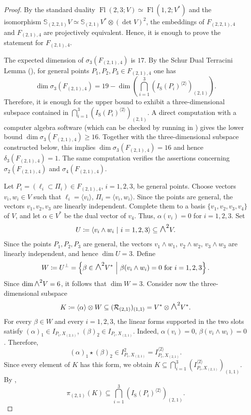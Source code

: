 \documentclass[a4paper,reqno]{amsart}
\theoremstyle{plainnopunct}
\theoremstyle{definitionnopunct}
\newcommand{\superwedge}{\mathlarger{\mathlarger{\wedge}}}
\renewcommand{\S}{\mathbb{S}}
\newcommand{\cR}{\mathcal{R}}
\DeclareMathOperator{\Fl}{Fl}
\begin{document}
\begin{proof}
By the standard duality
$\Fl(2,3;V)
\simeq
\Fl(1,2;V^*)$
and the isomorphism
$\S_{(2,2,1)}V
\simeq
\S_{(2,1)}V^*
\otimes
(\det V)^2$,
the embeddings of $F_{(2,2,1),4}$ and $F_{(2,1),4}$ are
projectively equivalent. Hence, it is enough to prove the statement
for $F_{(2,1),4}$.

The expected dimension of $\sigma_3(F_{(2,1),4})$ is $17$.
By the Schur Dual Terracini Lemma
(), for general points
$P_1,P_2,P_3\in F_{(2,1),4}$ one has
\[
\dim\sigma_3(F_{(2,1),4})
=
19-
\dim
\left(
\bigcap_{i=1}^{3}
\left(
I_{\mathrm S}(P_i)^{\langle2\rangle}
\right)_{(2,1)}
\right).
\]
Therefore, it is enough for the upper bound to exhibit a
three-dimensional subspace contained in $\bigcap_{i=1}^{3}
\left(
I_{\mathrm S}(P_i)^{\langle2\rangle}
\right)_{(2,1)}$.
A direct computation with a computer algebra software
(which can be checked by running  in \cite{Repo})
gives the lower bound $\dim\sigma_3(F_{(2,1),4})\geq16$.
Together with the three-dimensional subspace constructed below, this
implies $\dim\sigma_3(F_{(2,1),4})=16$
and hence $\delta_3(F_{(2,1),4})=1$.
The same computation verifies the assertions concerning
$\sigma_2(F_{(2,1),4})$ and $\sigma_4(F_{(2,1),4})$.

Let $P_i=(\ell_i\subset\Pi_i)
\in
F_{(2,1),4}$, $i=1,2,3$,
be general points. Choose vectors $v_i,w_i\in V$ such that $\ell_i=\langle v_i\rangle$,
$\Pi_i=\langle v_i,w_i\rangle$.
Since the points are general, the vectors $v_1,v_2,v_3$
are linearly independent. Complete them to a basis $\{v_1,v_2,v_3,v_4\}$
 of $V$, and let $\alpha\in V^*$
be the dual vector of $v_4$. Thus, $\alpha(v_i)=0$ for $i=1,2,3$. Set
\[
U
\coloneq
\left\langle
v_i\wedge w_i
\ \middle|\
i=1,2,3
\right\rangle
\subseteq
\superwedge^2V.
\]
Since the points $P_1,P_2,P_3$ are general, the vectors
$v_1\wedge w_1$, $v_2\wedge w_2$,
$v_3\wedge w_3$
are linearly independent, and hence
$\dim U=3$.
Define
\[
W
\coloneq
U^\perp
=
\left\{
\beta\in\superwedge^2V^*
\ \middle|\
\beta(v_i\wedge w_i)=0
\text{ for }i=1,2,3
\right\}.
\]
Since $\dim\superwedge^2V=6$,
it follows that
$\dim W=3$. Consider now the three-dimensional subspace
\[
K
\coloneq
\langle\alpha\rangle\otimes W
\subseteq
(\cR_{(2,1)})_{(1,1)}
=
V^*\otimes\superwedge^2V^*.
\]
For every $\beta\in W$ and every $i=1,2,3$, the linear forms
supported in the two slots satisfy
$(\alpha)_1
\in
I_{P_i,X_{(2,1)}}$, $(\beta)_2
\in
I_{P_i,X_{(2,1)}}$.
Indeed, $\alpha(v_i)=0$, $\beta(v_i\wedge w_i)=0$.
Therefore,
\[
(\alpha)_1\star(\beta)_2
\in
I_{P_i,X_{(2,1)}}^2
=
I_{P_i,X_{(2,1)}}^{\langle2\rangle}.
\]
Since every element of $K$ has this form, we obtain $K
\subseteq
\bigcap_{i=1}^3
\left(
I_{P_i,X_{(2,1)}}^{\langle2\rangle}
\right)_{(1,1)}$.
By
,
\[
\pi_{(2,1)}(K)
\subseteq
\bigcap_{i=1}^3
\left(
I_{\mathrm S}(P_i)^{\langle2\rangle}
\right)_{(2,1)}.
\]


\end{proof}
\end{document}
